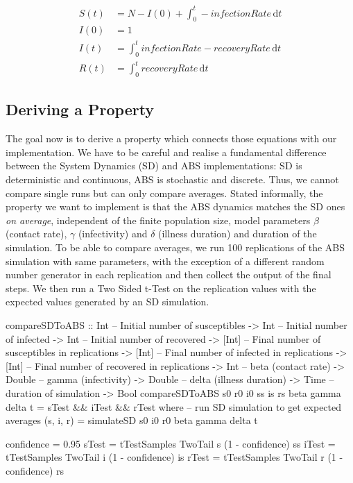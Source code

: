 \begin{align}
S(t) &= N - I(0) + \int_0^t -infectionRate\, \mathrm{d}t \\
I(0) &= 1 \\
I(t) &= \int_0^t infectionRate - recoveryRate\, \mathrm{d}t \\
R(t) &= \int_0^t recoveryRate\, \mathrm{d}t
\end{align}

\subsection{Deriving a Property}
The goal now is to derive a property which connects those equations with our implementation. We have to be careful and realise a fundamental difference between the System Dynamics (SD) and ABS implementations: SD is deterministic and continuous, ABS is stochastic and discrete. Thus, we cannot compare single runs but can only compare averages. Stated informally, the property we want to implement is that the ABS dynamics matches the SD ones \textit{on average}, independent of the finite population size, model parameters $\beta$ (contact rate), $\gamma$ (infectivity) and $\delta$ (illness duration) and duration of the simulation. To be able to compare averages, we run 100 replications of the ABS simulation with same parameters, with the exception of a different random number generator in each replication and then collect the output of the final steps. We then run a Two Sided t-Test on the replication values with the expected values generated by an SD simulation.

\begin{HaskellCode}
compareSDToABS :: Int    -- Initial number of susceptibles
               -> Int    -- Initial number of infected
               -> Int    -- Initial number of recovered
               -> [Int]  -- Final number of susceptibles in replications
               -> [Int]  -- Final number of infected in replications
               -> [Int]  -- Final number of recovered in replications
               -> Int    -- beta (contact rate)
               -> Double -- gamma (infectivity)
               -> Double -- delta (illness duration)
               -> Time   -- duration of simulation
               -> Bool
compareSDToABS s0 r0 i0
               ss is rs
               beta gamma delta t = sTest && iTest && rTest
  where
    -- run SD simulation to get expected averages
    (s, i, r) = simulateSD s0 i0 r0 beta gamma delta t
    
    confidence = 0.95
    sTest = tTestSamples TwoTail s (1 - confidence) ss
    iTest = tTestSamples TwoTail i (1 - confidence) is
    rTest = tTestSamples TwoTail r (1 - confidence) rs
\end{HaskellCode}

